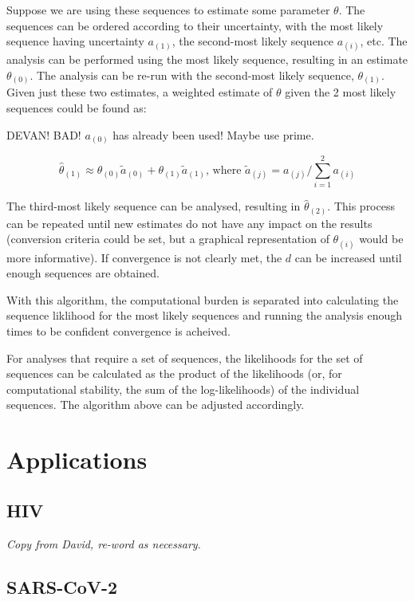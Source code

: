 \documentclass[
]{article}
\begin{document}
Suppose we are using these sequences to estimate some parameter
\(\theta\). The sequences can be ordered according to their uncertainty,
with the most likely sequence having uncertainty \(a_{(1)}\), the
second-most likely sequence \(a_{(i)}\), etc. The analysis can be
performed using the most likely sequence, resulting in an estimate
\(\theta_{(0)}\). The analysis can be re-run with the second-most likely
sequence, \(\theta_{(1)}\). Given just these two estimates, a weighted
estimate of \(\theta\) given the 2 most likely sequences could be found
as:

DEVAN! BAD! \(a_{(0)}\) has already been used! Maybe use prime.

\[
\hat\theta_{(1)} \approx \theta_{(0)} \tilde a_{(0)} + \theta_{(1)}\tilde a_{(1)}\text{, where }\tilde a_{(j)}=a_{(j)}/\sum_{i=1}^2a_{(i)}
\]

The third-most likely sequence can be analysed, resulting in
\(\hat\theta_{(2)}\). This process can be repeated until new estimates
do not have any impact on the results (conversion criteria could be set,
but a graphical representation of \(\theta_{(i)}\) would be more
informative). If convergence is not clearly met, the \(d\) can be
increased until enough sequences are obtained.

With this algorithm, the computational burden is separated into
calculating the sequence liklihood for the most likely sequences and
running the analysis enough times to be confident convergence is
acheived.

For analyses that require a set of sequences, the likelihoods for the
set of sequences can be calculated as the product of the likelihoods
(or, for computational stability, the sum of the log-likelihoods) of the
individual sequences. The algorithm above can be adjusted accordingly.

\hypertarget{applications}{%
\section{Applications}\label{applications}}

\hypertarget{hiv}{%
\subsection{HIV}\label{hiv}}

\emph{Copy from David, re-word as necessary.}

\hypertarget{sars-cov-2}{%
\subsection{SARS-CoV-2}\label{sars-cov-2}}
\end{document}
